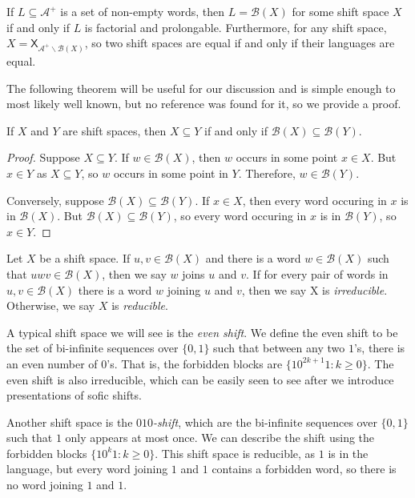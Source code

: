 \documentclass[hidelinks]{article}
\newcommand{\Ac}{\mathcal{A}}  %
\newcommand{\Bc}{\mathcal{B}}
\newcommand{\shift}[1]{\mathsf{X}_{#1}}
\newcommand{\term}[1]{\textit{#1}}
\theoremstyle{definition}
\begin{document}
\begin{theorem}[name=\cite{lind1995introduction}]
    If \(L \subseteq \Ac^+\) is a set of non-empty words, then \(L = \Bc(X)\) for some 
    shift space \(X\) if and only if \(L\) is factorial and prolongable. 
    Furthermore, for any shift space, \(X = \shift{\Ac^+\backslash\Bc(X)}\), so 
    two shift spaces are equal if and only if their languages are equal.
\end{theorem}

The following theorem will be useful for our discussion and is simple enough to 
most likely well known, but no reference was found for it, so we provide a proof.

\begin{theorem}
    If \(X\) and \(Y\) are shift spaces, then \(X \subseteq Y\) if and only if \(\Bc(X) \subseteq \Bc(Y)\).
\end{theorem}

\begin{proof}
    Suppose \(X \subseteq Y\). If \(w \in \Bc(X)\), then \(w\) occurs in some point 
    \(x \in X\). But \(x \in Y\) as \(X \subseteq Y\), so \(w\) occurs in some point 
    in \(Y\). Therefore, \(w \in \Bc(Y)\).

    Conversely, suppose \(\Bc(X) \subseteq \Bc(Y)\). If \(x \in X\), then every 
    word occuring in \(x\) is in \(\Bc(X)\). But \(\Bc(X) \subseteq \Bc(Y)\), 
    so every word occuring in \(x\) is in \(\Bc(Y)\), so \(x \in Y\).
\end{proof}

\begin{definition}
    Let \(X\) be a shift space. If \(u, v \in \Bc(X)\) and there 
    is a word \(w \in \Bc(X)\) such that \(uwv \in \Bc(X)\), then we say 
    \(w\) joins \(u\) and \(v\). If for every pair of words in \(u, v \in \Bc(X)\) 
    there is a word \(w\) joining \(u\) and \(v\), then we say X is \term{irreducible}.
    Otherwise, we say \(X\) is \term{reducible}.
\end{definition}

\begin{example}
    A typical shift space we will see is the \term{even shift}. We define 
    the even shift to be the set of bi-infinite sequences over \(\{0, 1\}\)
    such that between any two \(1\)'s, there is an even number of \(0\)'s. That 
    is, the forbidden blocks are \(\{10^{2k+1}1 : k \geq 0\}\). The even shift is 
    also irreducible, which can be easily seen to see after we introduce 
    presentations of sofic shifts. 

    Another shift space is the \term{\(010\)-shift}, which are 
    the bi-infinite sequences over \(\{0, 1\}\) such that \(1\) only appears at most once. 
    We can describe the shift using the forbidden blocks \(\{10^k1 : k \geq 0\}\). This 
    shift space is reducible, as \(1\) is in the language, but every word joining 
    \(1\) and \(1\) contains a forbidden word, so there is no word joining \(1\) and \(1\).
\end{example}
\end{document}

